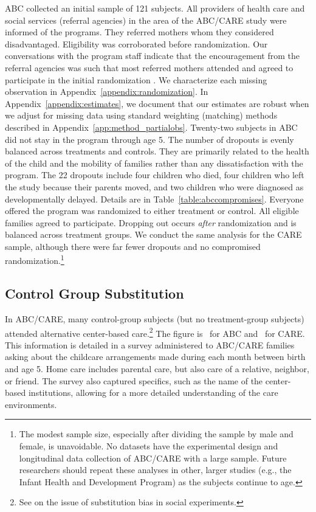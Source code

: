 ABC collected an initial sample of 121 subjects. All providers of health care and social services (referral agencies) in the area of the ABC/CARE study were informed of the programs. They referred mothers whom they considered disadvantaged. Eligibility was corroborated before randomization. Our conversations with the program staff indicate that the encouragement from the referral agencies was such that most referred mothers attended and agreed to participate in the initial randomization \citep{Ramey-etal_2012-ABC}. We characterize each missing observation in Appendix~\ref{appendix:randomization}. In Appendix~\ref{appendix:estimates}, we document that our estimates are robust when we adjust for missing data using standard weighting (matching) methods described in Appendix~\ref{app:method_partialobs}. Twenty-two subjects in ABC did not stay in the program through age 5. The number of dropouts is evenly balanced across treatments and controls. They are primarily related to the health of the child and the mobility of families rather than any dissatisfaction with the program. The 22 dropouts include four children who died, four children who left the study because their parents moved, and two children who were diagnosed as developmentally delayed. Details are in Table~\ref{table:abccompromises}. Everyone offered the program was randomized to either treatment or control. All eligible families agreed to participate. Dropping out occurs \emph{after} randomization and is balanced across treatment groups. We conduct the same analysis for the CARE sample, although there were far fewer dropouts and no compromised randomization.\footnote{The modest sample size, especially after dividing the sample by male and female, is unavoidable. No datasets have the experimental design and longitudinal data collection of ABC/CARE with a large sample. Future researchers should repeat these analyses in other, larger studies (e.g., the Infant Health and Development Program) as the subjects continue to age.} 

\subsection{Control Group Substitution}

In ABC/CARE, many control-group subjects (but no treatment-group subjects) attended alternative center-based care.\footnote{See \cite{Heckman_Hohmann_etal_2000_QJE} on the issue of substitution bias in social experiments.} The figure is \treatsubsabc\ for ABC and \treatsubscarec\ for CARE. This information is detailed in a survey administered to ABC/CARE families asking about the childcare arrangements made during each month between birth and age 5. Home care includes parental care, but also care of a relative, neighbor, or friend. The survey also captured specifics, such as the name of the center-based institutions, allowing for a more detailed understanding of the care environments.

